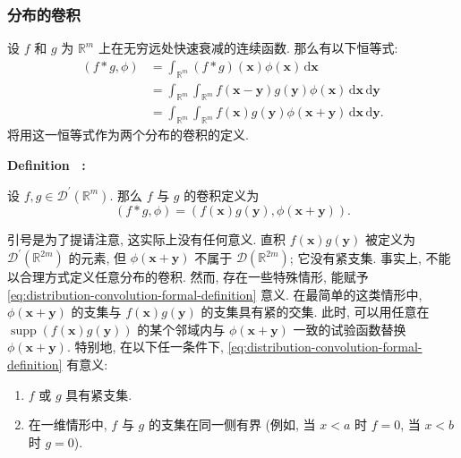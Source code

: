 \subsubsection{分布的卷积}\label{subsec:distribution-convolution}

设 $f$ 和 $g$ 为 $\mathbb{R}^m$ 上在无穷远处快速衰减的连续函数. 那么有以下恒等式:
\begin{equation}\label{eq:convolution-test-pairing-integral-identity}
\begin{aligned}
(f*g,\phi)&=\int_{\mathbb{R}^m}(f*g)(\bm{x})\phi(\bm{x})\,\mathrm{d}\bm{x}\\
&=\int_{\mathbb{R}^m}\int_{\mathbb{R}^m}f(\bm{x}-\bm{y})g(\bm{y})\phi(\bm{x})\,\mathrm{d}\bm{x}\,\mathrm{d}\bm{y}\\
&=\int_{\mathbb{R}^m}\int_{\mathbb{R}^m}f(\bm{x})g(\bm{y})\phi(\bm{x}+\bm{y})\,\mathrm{d}\bm{x}\,\mathrm{d}\bm{y}.
\end{aligned}
\end{equation}
将用这一恒等式作为两个分布的卷积的定义.

\begingroup
{}
{
    {\sffamily\bfseries\color{PageColor}\fontsize{10.95}{13.2}\selectfont
     \textquotedbl Definition\textquotedbl~\thestatement
     \textbf{:}}\quad
    \kaishu
}
{\par}
\begin{Definition}
\label{def:distribution-convolution-formal}
设 $f,g\in\mathcal{D}^{\prime}(\mathbb{R}^m)$. 那么 $f$ 与 $g$ 的卷积定义为
\begin{equation}\label{eq:distribution-convolution-formal-definition}
(f*g,\phi)=(f(\bm{x})g(\bm{y}),\phi(\bm{x}+\bm{y})).
\end{equation}

\end{Definition}
\endgroup

引号是为了提请注意, 这实际上没有任何意义. 直积 $f(\bm{x})g(\bm{y})$ 被定义为 $\mathcal{D}^{\prime}(\mathbb{R}^{2m})$ 的元素, 但 $\phi(\bm{x}+\bm{y})$ 不属于 $\mathcal{D}(\mathbb{R}^{2m})$; 它没有紧支集. 事实上, 不能以合理方式定义任意分布的卷积. 然而, 存在一些特殊情形, 能赋予 \eqref{eq:distribution-convolution-formal-definition} 意义. 在最简单的这类情形中, $\phi(\bm{x}+\bm{y})$ 的支集与 $f(\bm{x})g(\bm{y})$ 的支集具有紧的交集. 此时, 可以用任意在 $\operatorname{supp}(f(\bm{x})g(\bm{y}))$ 的某个邻域内与 $\phi(\bm{x}+\bm{y})$ 一致的试验函数替换 $\phi(\bm{x}+\bm{y})$. 特别地, 在以下任一条件下, \eqref{eq:distribution-convolution-formal-definition} 有意义:
\begin{enumerate}
\item $f$ 或 $g$ 具有紧支集.
\item 在一维情形中, $f$ 与 $g$ 的支集在同一侧有界 (例如, 当 $x<a$ 时 $f=0$, 当 $x<b$ 时 $g=0$).
\end{enumerate}

